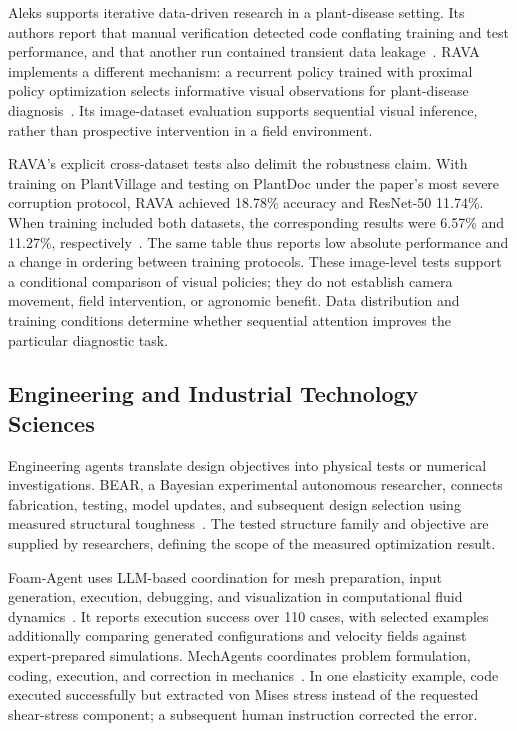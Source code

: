 Aleks supports iterative data-driven research in a plant-disease setting. Its authors report that manual verification detected code conflating training and test performance, and that another run contained transient data leakage~\cite{asd0634}. RAVA implements a different mechanism: a recurrent policy trained with proximal policy optimization selects informative visual observations for plant-disease diagnosis~\cite{asd1133}. Its image-dataset evaluation supports sequential visual inference, rather than prospective intervention in a field environment.

RAVA's explicit cross-dataset tests also delimit the robustness claim. With training on PlantVillage and testing on PlantDoc under the paper's most severe corruption protocol, RAVA achieved 18.78\% accuracy and ResNet-50 11.74\%. When training included both datasets, the corresponding results were 6.57\% and 11.27\%, respectively~\cite{asd1133}. The same table thus reports low absolute performance and a change in ordering between training protocols. These image-level tests support a conditional comparison of visual policies; they do not establish camera movement, field intervention, or agronomic benefit. Data distribution and training conditions determine whether sequential attention improves the particular diagnostic task.

\subsection{Engineering and Industrial Technology Sciences}

Engineering agents translate design objectives into physical tests or numerical investigations. BEAR, a Bayesian experimental autonomous researcher, connects fabrication, testing, model updates, and subsequent design selection using measured structural toughness~\cite{asd0504}. The tested structure family and objective are supplied by researchers, defining the scope of the measured optimization result.

Foam-Agent uses LLM-based coordination for mesh preparation, input generation, execution, debugging, and visualization in computational fluid dynamics~\cite{asd0047}. It reports execution success over 110 cases, with selected examples additionally comparing generated configurations and velocity fields against expert-prepared simulations. MechAgents coordinates problem formulation, coding, execution, and correction in mechanics~\cite{asd0128}. In one elasticity example, code executed successfully but extracted von Mises stress instead of the requested shear-stress component; a subsequent human instruction corrected the error.

